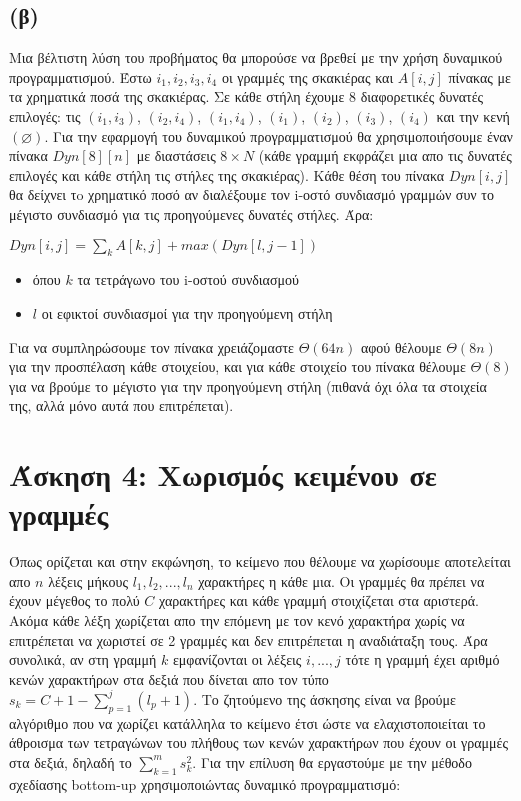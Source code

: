 \documentclass[a4paper,12pt]{report}
\begin{document}
\subsection*{(β)}
Μια βέλτιστη λύση του προβήματος θα μπορούσε να βρεθεί με την χρήση δυναμικού προγραμματισμού. Έστω $i_1,i_2,i_3,i_4$ οι γραμμές της σκακιέρας και $A[i,j]$ πίνακας με τα χρηματικά ποσά της σκακιέρας. Σε κάθε στήλη έχουμε 8 διαφορετικές δυνατές επιλογές: τις $(i_1,i_3)$, $(i_2,i_4)$, $(i_1,i_4)$, $(i_1)$, $(i_2)$, $(i_3)$, $(i_4)$ και την κενή $(\varnothing)$. Για την εφαρμογή του δυναμικού προγραμματισμού θα χρησιμοποιήσουμε έναν πίνακα $Dyn[8][n]$ με διαστάσεις $8 \times N$ (κάθε γραμμή εκφράζει μια απο τις δυνατές επιλογές και κάθε στήλη τις στήλες της σκακιέρας). Kάθε θέση του πίνακα $Dyn[i,j]$ θα δείχνει τo χρηματικό ποσό αν διαλέξουμε τον i-οστό συνδιασμό γραμμών συν το μέγιστο συνδιασμό για τις προηγούμενες δυνατές στήλες. Άρα:
\begin{center}
 $Dyn[i,j]=\sum_{k}{A[k,j]} + max(Dyn[l,j-1])$ 
\begin{itemize}
 \item όπου $k$ τα τετράγωνο του i-οστού συνδιασμού
 \item $l$ οι εφικτοί συνδιασμοί για την προηγούμενη στήλη
\end{itemize}
\end{center}

Για να συμπληρώσουμε τον πίνακα χρειάζομαστε $\Theta(64n)$ αφού θέλουμε $\Theta(8n)$ για την προσπέλαση κάθε στοιχείου, και για κάθε στοιχείο του πίνακα θέλουμε $\Theta(8)$ για να βρούμε το μέγιστο για την προηγούμενη στήλη (πιθανά όχι όλα τα στοιχεία της, αλλά μόνο αυτά που επιτρέπεται).  

\section*{Άσκηση 4: Χωρισμός κειμένου σε γραμμές}
Όπως ορίζεται και στην εκφώνηση, το κείμενο που θέλουμε να χωρίσουμε αποτελείται απο $n$ λέξεις μήκους $l_1,l_2,...,l_n$ χαρακτήρες η κάθε μια. Οι γραμμές θα πρέπει να έχουν μέγεθος το πολύ $C$ χαρακτήρες και κάθε γραμμή στοιχίζεται στα αριστερά. Ακόμα κάθε λέξη χωρίζεται απο την επόμενη με τον κενό χαρακτήρα χωρίς να επιτρέπεται να χωριστεί σε 2 γραμμές και δεν επιτρέπεται η αναδιάταξη τους. Άρα συνολικά, αν στη γραμμή $k$ εμφανίζονται οι λέξεις $i,...,j$ τότε η γραμμή έχει αριθμό κενών χαρακτήρων στα δεξιά που δίνεται απο τον τύπο $s_k=C+1-\sum_{p=1}^{j}{(l_p+1)}$. Το ζητούμενο της άσκησης είναι να βρούμε αλγόριθμο που να χωρίζει κατάλληλα το κείμενο έτσι ώστε να ελαχιστοποιείται το άθροισμα των τετραγώνων του πλήθους των κενών χαρακτήρων που έχουν οι γραμμές στα δεξιά, δηλαδή το $\sum_{k=1}^{m}{s_k^2}$. Για την επίλυση θα εργαστούμε με την μέθοδο σχεδίασης bottom-up χρησιμοποιώντας δυναμικό προγραμματισμό:
\end{document}
